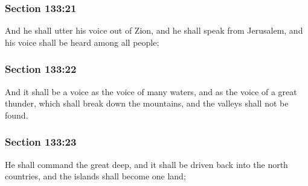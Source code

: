 	\subsubsection{Section 133:21} %
		\label{DC133-21}

		And he shall utter his voice out of Zion, and he shall speak from Jerusalem, and his voice shall be heard among all people;


	\subsubsection{Section 133:22} %
		\label{DC133-22}

		And it shall be a voice as the voice of many waters, and as the voice of a great thunder, which shall break down the mountains, and the valleys shall not be found.


	\subsubsection{Section 133:23} %
		\label{DC133-23}

		He shall command the great deep, and it shall be driven back into the north countries, and the islands shall become one land;


